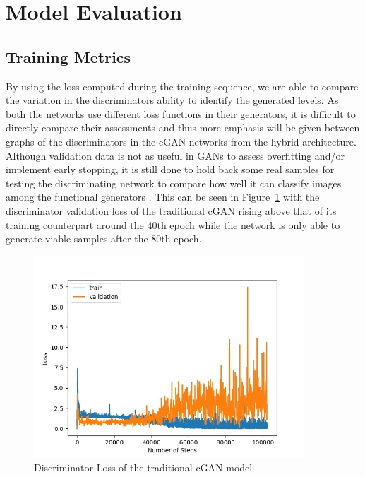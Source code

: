 \documentclass{Configuration_Files/PoliMi3i_thesis}
\begin{document}
\section{Model Evaluation}
\subsection{Training Metrics}
By using the loss computed during the training sequence, we are able to compare the 
variation in the discriminators ability to identify the generated levels. As both the 
networks use different loss functions in their generators, it is difficult to directly
compare their assessments and thus more emphasis will be given between graphs of 
the discriminators in the cGAN networks from the hybrid architecture. Although 
validation data is not as useful in GANs to assess overfitting and/or implement early 
stopping, it is still done to hold back some real samples for testing the discriminating 
network to compare how well it can classify images among the functional generators 
\cite{DeT20}. This can be seen in Figure~\ref{fig:tradloss} with the discriminator validation
 loss of the traditional cGAN rising above that of its training counterpart around the 40th 
epoch while the network is only able to generate viable samples after the 80th epoch.
\begin{figure}[H]
    \centering
    \includegraphics[width=0.9\textwidth]{trad_cgan_loss.jpg}
    \caption{Discriminator Loss of the traditional cGAN model}
    \label{fig:tradloss}
\end{figure}
\end{document}
